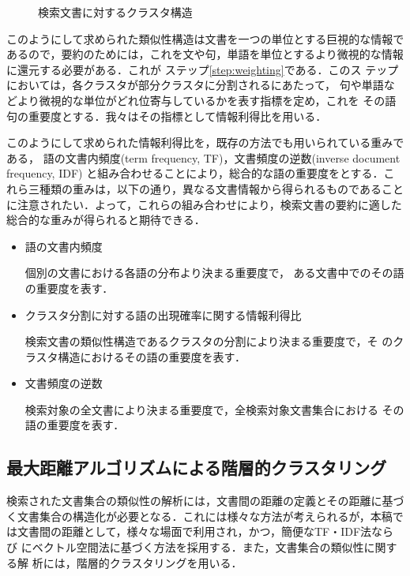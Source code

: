 \begin{figure}[htbp]
\begin{center}
\end{center}
\caption{検索文書に対するクラスタ構造}\label{Fig:SuperCluster}
\end{figure}

このようにして求められた類似性構造は文書を一つの単位とする巨視的な情報で
あるので，要約のためには，これを文や句，単語を単位とするより微視的な情報
に還元する必要がある．これが ステップ\ref{step:weighting}である．このス
テップにおいては，各クラスタが部分クラスタに分割されるにあたって，
句や単語などより微視的な単位がどれ位寄与しているかを表す指標を定め，これを
その語句の重要度とする．我々はその指標として情報利得比を用いる．

このようにして求められた情報利得比を，既存の方法でも用いられている重みである，
語の文書内頻度(term frequency, TF)，文書頻度の逆数(inverse document
frequency,
IDF)\cite{Salton:TermWeightingApproachesInAutomaticTextRetrieval,Baeza-Yates:ModernInformationRetrieval}
と組み合わせることにより，総合的な語の重要度をとする．こ
れら三種類の重みは，以下の通り，異なる文書情報から得られるものであること
に注意されたい．よって，これらの組み合わせにより，検索文書の要約に適した
総合的な重みが得られると期待できる．

\begin{itemize}
 \item 語の文書内頻度

       個別の文書における各語の分布より決まる重要度で，
       ある文書中でのその語の重要度を表す．

 \item クラスタ分割に対する語の出現確率に関する情報利得比

       検索文書の類似性構造であるクラスタの分割により決まる重要度で，そ
       のクラスタ構造におけるその語の重要度を表す．

 \item 文書頻度の逆数

       検索対象の全文書により決まる重要度で，全検索対象文書集合における
       その語の重要度を表す．
\end{itemize}


\subsection{最大距離アルゴリズムによる階層的クラスタリング}

検索された文書集合の類似性の解析には，文書間の距離の定義とその距離に基づ
く文書集合の構造化が必要となる．これには様々な方法が考えられるが，本稿で
は文書間の距離として，様々な場面で利用され，かつ，簡便なTF・IDF法ならび
にベクトル空間法に基づく方法を採用する\cite{Baeza-Yates:ModernInformationRetrieval}．また，文書集合の類似性に関する解
析には，階層的クラスタリングを用いる．

